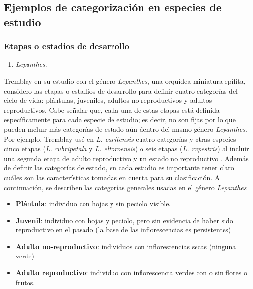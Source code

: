\documentclass[
]{book}
\providecommand{\tightlist}{%
  \setlength{\itemsep}{0pt}\setlength{\parskip}{0pt}}
\theoremstyle{definition}
\theoremstyle{definition}
\theoremstyle{definition}
\theoremstyle{definition}
\theoremstyle{remark}
\begin{document}
\subsection{Ejemplos de categorización en especies de estudio}\label{ejemplos-de-categorizaciuxf3n-en-especies-de-estudio}

\subsubsection{Etapas o estadios de desarrollo}\label{etapas-o-estadios-de-desarrollo}

\begin{enumerate}
\def\labelenumi{\alph{enumi})}
\tightlist
\item
  \emph{Lepanthes}.
\end{enumerate}

Tremblay \citep{tremblay1997lepanthes} en su estudio con el género \emph{Lepanthes}, una orquídea miniatura epífita, considero las etapas o estadios de desarrollo para definir cuatro categorías del ciclo de vida: plántulas, juveniles, adultos no reproductivos y adultos reproductivos.
Cabe señalar que, cada una de estas etapas está definida específicamente para cada especie de estudio; es decir, no son fijas por lo que pueden incluir más categorías de estado aún dentro del mismo género \emph{Lepanthes}.
Por ejemplo, Tremblay usó en \emph{L. caritensis} \citep{tremblay2003population} cuatro categorías y otras especies cinco etapas (\emph{L. rubripetala} y \emph{L. eltoroensis}) o seis etapas (\emph{L. rupestris}) al incluir una segunda etapa de adulto reproductivo y un estado no reproductivo \citep{tremblay2001gene}.
Además de definir las categorías de estado, en cada estudio es importante tener claro cuáles son las características tomadas en cuenta para su clasificación.
A continuación, se describen las categorías generales usadas en el género \emph{Lepanthes} \citep{tremblay2003population}

\begin{itemize}
\item
  \textbf{Plántula}: individuo con hojas y sin peciolo visible.
\item
  \textbf{Juvenil}: individuo con hojas y peciolo, pero sin evidencia de haber sido reproductivo en el pasado (la base de las inflorescencias es persistentes)
\item
  \textbf{Adulto no-reproductivo}: individuos con inflorescencias secas (ninguna verde)
\item
  \textbf{Adulto reproductivo}: individuo con inflorescencia verdes con o sin flores o frutos.
\end{itemize}
\end{document}

